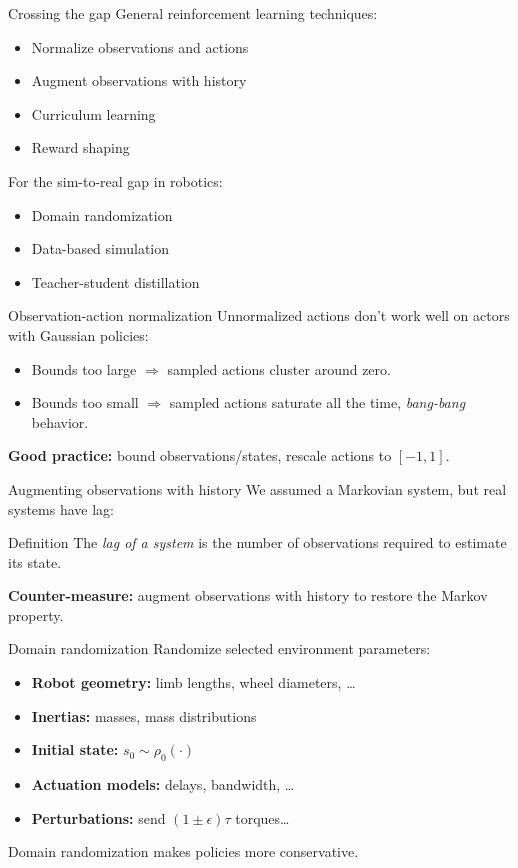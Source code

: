 \documentclass[10pt, aspectratio=1610]{beamer}
\begin{document}
\begin{frame}{Crossing the gap}
    General reinforcement learning techniques:
    \begin{itemize}
        \item Normalize observations and actions
        \item Augment observations with history
        \item Curriculum learning
        \item Reward shaping
    \end{itemize}
    For the sim-to-real gap in robotics:
    \begin{itemize}
        \item Domain randomization
        \item Data-based simulation
        \item Teacher-student distillation
    \end{itemize}
\end{frame}

\begin{frame}{Observation-action normalization}
    Unnormalized actions don't work well on actors with Gaussian policies:
    \begin{itemize}
        \item Bounds too large $\Rightarrow$ sampled actions cluster around zero.
        \item Bounds too small $\Rightarrow$ sampled actions saturate all the time, \emph{bang-bang} behavior.
    \end{itemize}
    \textbf{Good practice:} bound observations/states, rescale actions to $[-1, 1]$.
\end{frame}

\begin{frame}{Augmenting observations with history}
    We assumed a Markovian system, but real systems have lag:
    \begin{block}{Definition}
        The \emph{lag of a system} is the number of observations required to estimate its state.
    \end{block}
    \textbf{Counter-measure:} augment observations with history to restore the Markov property.
\end{frame}

\begin{frame}{Domain randomization}
    Randomize selected environment parameters:
    \begin{itemize}
        \item \textbf{Robot geometry:} limb lengths, wheel diameters, \ldots
        \item \textbf{Inertias:} masses, mass distributions
        \item \textbf{Initial state:} $s_0 \sim \rho_0(\cdot)$
        \item \textbf{Actuation models:} delays, bandwidth, \ldots
        \item \textbf{Perturbations:} send $(1 \pm \epsilon) \tau$ torques\ldots
    \end{itemize}
    Domain randomization makes policies more conservative.
\end{frame}
\end{document}
